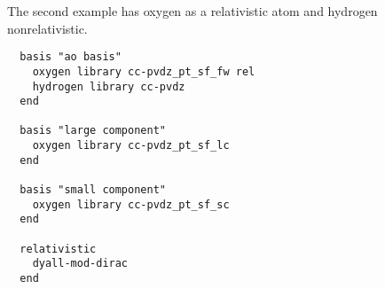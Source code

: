 The second example has oxygen as a relativistic atom and hydrogen nonrelativistic.

\begin{verbatim}
  basis "ao basis"
    oxygen library cc-pvdz_pt_sf_fw rel
    hydrogen library cc-pvdz
  end

  basis "large component"
    oxygen library cc-pvdz_pt_sf_lc
  end

  basis "small component"
    oxygen library cc-pvdz_pt_sf_sc
  end

  relativistic
    dyall-mod-dirac
  end
\end{verbatim}
